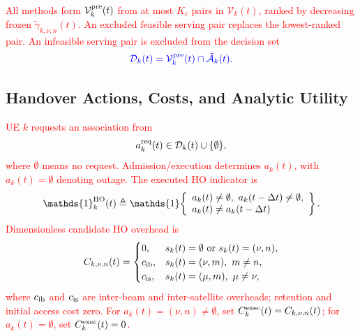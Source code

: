 \documentclass[10pt,letterpaper,journal]{IEEEtran}
\newcommand{\mathbbm}[1]{\mathds{#1}}
\newcommand{\revnew}[1]{\textcolor{red}{#1}}
\begin{document}
\revnew{All methods form $\mathcal V_k^{\rm pre}(t)$ from at most $K_c$ pairs in $\mathcal V_k(t)$, ranked by decreasing frozen $\tilde\gamma_{k,\nu,n}(t)$. An excluded feasible serving pair replaces the lowest-ranked pair. An infeasible serving pair is excluded from the decision set}
\begin{equation}
\textcolor{blue}{
\mathcal D_k(t) 
=\mathcal V_k^{\rm pre}(t)\cap\tilde{\mathcal A}_k(t).}  
\end{equation}


\vspace{-2mm}
\subsection{Handover Actions, Costs, and Analytic Utility}
\label{subsec:action_cost}

\textcolor{blue}{\revnew{UE $k$ requests an association from}
\begin{equation}
a_k^{\rm req}(t)\in\mathcal D_k(t)\cup\{\emptyset\},
\label{eq:action_sys_rev}
\end{equation}
\revnew{where $\emptyset$ means no request. Admission/execution determines $a_k(t)$, with $a_k(t)=\emptyset$ denoting outage.}}
\revnew{The executed HO indicator is}
\begin{equation}
\mathbbm{1}_k^{\rm HO}(t)\triangleq
\mathbbm{1}\!\left\{\begin{array}{l}
a_k(t)\neq\emptyset,\ a_k(t-\Delta t)\neq\emptyset,\\
a_k(t)\neq a_k(t-\Delta t)
\end{array}\right\}.
\label{eq:ho_indicator}
\end{equation}
\textcolor{blue}{\revnew{Dimensionless candidate HO overhead is}
\begin{equation}
C_{k,\nu,n}(t)=
\begin{cases}
0,
& s_k(t)=\emptyset \text{ or } s_k(t)=(\nu,n),\\
c_{\rm ib},
& s_k(t)=(\nu,m),\ m\neq n,\\
c_{\rm is},
& s_k(t)=(\mu,m),\ \mu\neq\nu,
\end{cases}    
\end{equation}
\revnew{where $c_{\rm ib}$ and $c_{\rm is}$ are inter-beam and inter-satellite overheads; retention and initial access cost zero. For $a_k(t)=(\nu,n)\neq\emptyset$, set $C_k^{\rm exec}(t)=C_{k,\nu,n}(t)$; for $a_k(t)=\emptyset$, set $C_k^{\rm exec}(t)=0$.}}
\end{document}
